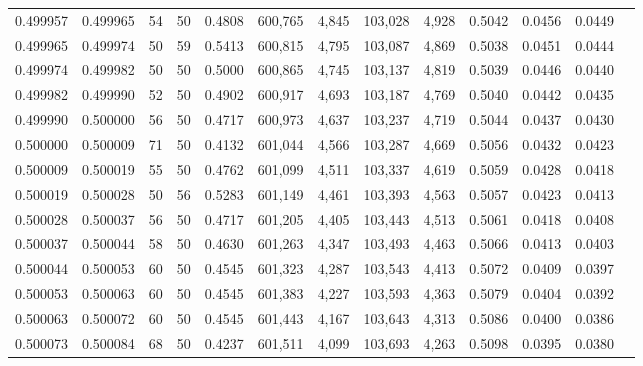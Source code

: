 \begin{tabular}{rrrrrrrrrrrrr}
0.499957 & 0.499965 &    54 &  50 &                                     0.4808 & 600,765 &   4,845 & 103,028 &   4,928 & 0.5042 & 0.0456 & 0.0449 \\
0.499965 & 0.499974 &    50 &  59 &                                     0.5413 & 600,815 &   4,795 & 103,087 &   4,869 & 0.5038 & 0.0451 & 0.0444 \\
0.499974 & 0.499982 &    50 &  50 &                                     0.5000 & 600,865 &   4,745 & 103,137 &   4,819 & 0.5039 & 0.0446 & 0.0440 \\
0.499982 & 0.499990 &    52 &  50 &                                     0.4902 & 600,917 &   4,693 & 103,187 &   4,769 & 0.5040 & 0.0442 & 0.0435 \\
0.499990 & 0.500000 &    56 &  50 &                                     0.4717 & 600,973 &   4,637 & 103,237 &   4,719 & 0.5044 & 0.0437 & 0.0430 \\
0.500000 & 0.500009 &    71 &  50 &                                     0.4132 & 601,044 &   4,566 & 103,287 &   4,669 & 0.5056 & 0.0432 & 0.0423 \\
0.500009 & 0.500019 &    55 &  50 &                                     0.4762 & 601,099 &   4,511 & 103,337 &   4,619 & 0.5059 & 0.0428 & 0.0418 \\
0.500019 & 0.500028 &    50 &  56 &                                     0.5283 & 601,149 &   4,461 & 103,393 &   4,563 & 0.5057 & 0.0423 & 0.0413 \\
0.500028 & 0.500037 &    56 &  50 &                                     0.4717 & 601,205 &   4,405 & 103,443 &   4,513 & 0.5061 & 0.0418 & 0.0408 \\
0.500037 & 0.500044 &    58 &  50 &                                     0.4630 & 601,263 &   4,347 & 103,493 &   4,463 & 0.5066 & 0.0413 & 0.0403 \\
0.500044 & 0.500053 &    60 &  50 &                                     0.4545 & 601,323 &   4,287 & 103,543 &   4,413 & 0.5072 & 0.0409 & 0.0397 \\
0.500053 & 0.500063 &    60 &  50 &                                     0.4545 & 601,383 &   4,227 & 103,593 &   4,363 & 0.5079 & 0.0404 & 0.0392 \\
0.500063 & 0.500072 &    60 &  50 &                                     0.4545 & 601,443 &   4,167 & 103,643 &   4,313 & 0.5086 & 0.0400 & 0.0386 \\
0.500073 & 0.500084 &    68 &  50 &                                     0.4237 & 601,511 &   4,099 & 103,693 &   4,263 & 0.5098 & 0.0395 & 0.0380 \\

\end{tabular}
